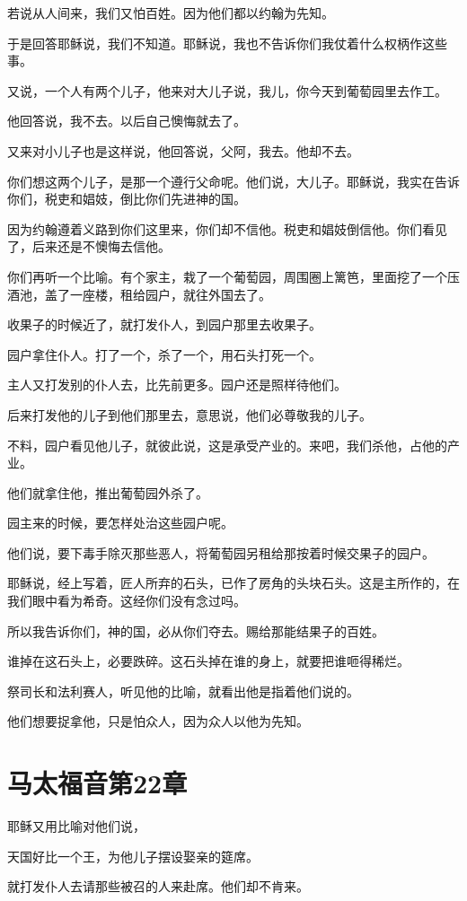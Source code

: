 \documentclass[12pt,oneside]{book}
\begin{document}
若说从人间来，我们又怕百姓。因为他们都以约翰为先知。

于是回答耶稣说，我们不知道。耶稣说，我也不告诉你们我仗着什么权柄作这些事。

又说，一个人有两个儿子，他来对大儿子说，我儿，你今天到葡萄园里去作工。

他回答说，我不去。以后自己懊悔就去了。

又来对小儿子也是这样说，他回答说，父阿，我去。他却不去。

你们想这两个儿子，是那一个遵行父命呢。他们说，大儿子。耶稣说，我实在告诉你们，税吏和娼妓，倒比你们先进神的国。

因为约翰遵着义路到你们这里来，你们却不信他。税吏和娼妓倒信他。你们看见了，后来还是不懊悔去信他。

你们再听一个比喻。有个家主，栽了一个葡萄园，周围圈上篱笆，里面挖了一个压酒池，盖了一座楼，租给园户，就往外国去了。

收果子的时候近了，就打发仆人，到园户那里去收果子。

园户拿住仆人。打了一个，杀了一个，用石头打死一个。

主人又打发别的仆人去，比先前更多。园户还是照样待他们。

后来打发他的儿子到他们那里去，意思说，他们必尊敬我的儿子。

不料，园户看见他儿子，就彼此说，这是承受产业的。来吧，我们杀他，占他的产业。

他们就拿住他，推出葡萄园外杀了。

园主来的时候，要怎样处治这些园户呢。

他们说，要下毒手除灭那些恶人，将葡萄园另租给那按着时候交果子的园户。

耶稣说，经上写着，匠人所弃的石头，已作了房角的头块石头。这是主所作的，在我们眼中看为希奇。这经你们没有念过吗。

所以我告诉你们，神的国，必从你们夺去。赐给那能结果子的百姓。

谁掉在这石头上，必要跌碎。这石头掉在谁的身上，就要把谁咂得稀烂。

祭司长和法利赛人，听见他的比喻，就看出他是指着他们说的。

他们想要捉拿他，只是怕众人，因为众人以他为先知。

\chapter{马太福音第22章}
耶稣又用比喻对他们说，

天国好比一个王，为他儿子摆设娶亲的筵席。

就打发仆人去请那些被召的人来赴席。他们却不肯来。
\end{document}
